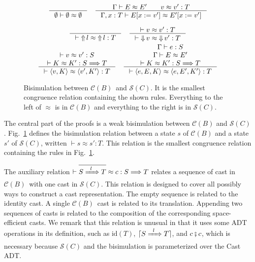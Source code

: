 \documentclass[runningheads]{llncs}
\newcommand{\infr}[2]{\inference{#1}{#2}}
\newcommand{\CMachine}[1]{\ensuremath{\mathcal{C}(#1)}}
\newcommand{\CBMachine}[0]{\CMachine{B}}
\newcommand{\SMachine}[1]{\ensuremath{\mathcal{S}(#1)}}
\newcommand{\error}[1]{\ensuremath{\mathop{\Uparrow}#1}}
\newcommand{\ccast}[3]{#1 \xRightarrow[]{\enskip #2 \enskip} #3}
\newcommand{\sexpr}[3]{\ensuremath{\langle#1,#2,#3\rangle}}
\newcommand{\scont}[2]{\ensuremath{\langle#1,#2\rangle}}
\newcommand{\shalt}[1]{\ensuremath{\mathop{\Downarrow} #1}}
\newcommand{\compose}[2]{\ensuremath{#1 \fatsemi #2}}
\newcommand{\translate}[1]{\ensuremath{\lceil#1\rceil}}
\newcommand{\id}[1]{\ensuremath{\mathrm{id}(#1)}}
\newcommand{\expressiontyping}[3]{\ensuremath{#1 \vdash #2 : #3}}
\newcommand{\valuetyping}[2]{\ensuremath{\vdash #1 : #2}}
\newcommand{\casttyping}[3]{\ensuremath{\vdash #1 : #2 \Longrightarrow #3}}
\newcommand{\bisimE}[3]{\ensuremath{#1 \vdash #2 \approx #3}}
\newcommand{\bisimv}[3]{\valuetyping{#1 \approx #2}{#3}}
\newcommand{\bisimc}[4]{\casttyping{#1 \approx #2}{#3}{#4}}
\newcommand{\bisimK}[4]{\casttyping{#1 \approx #2}{#3}{#4}}
\newcommand{\bisims}[3]{\valuetyping{\ensuremath{#1 \approx #2}}{#3}}
\begin{document}
\begin{figure}[tp]
\fbox{\bisimE{\Gamma}{E}{E}}
\begin{gather*}
\inference{
}{
	\bisimE{\emptyset}{\emptyset}{\emptyset}
}
\quad
\inference{
	\Gamma \vdash E \approx E' \qquad
	v \approx v' : T
}{
	\Gamma , x : T \vdash 
	E [ x := v' ] \approx E' [ x := v' ]
}
\end{gather*}

\fbox{\bisims{s}{s}{T}}
\begin{gather*}
\infr{}{\bisims{\error{l}}{\error{l}}{T}} \quad
\infr{
	\bisimv{v}{v'}{T}
}{
	\bisims{\shalt{v}}{\shalt{v'}}{T}
}
\\
\infr{
	\bisimv{v}{v'}{S} \\
	\bisimK{K}{K'}{S}{T}
}{
	\bisims{\scont{v}{K}}{\scont{v'}{K'}}{T}
} \quad
\infr{
	\expressiontyping{\Gamma}{e}{S} \\
	\bisimE{\Gamma}{E}{E'}          \\
	\bisimK{K}{K'}{S}{T}
}{
	\bisims{\sexpr{e}{E}{K}}{\sexpr{e}{E'}{K'}}{T}
}
\end{gather*}

\caption{Bisimulation between \CBMachine\ and \SMachine{C}. It is the
  smallest congruence relation containing the shown rules. Everything
  to the left of $\approx$ is in \CMachine{B} and everything to the
  right is in \SMachine{C}.}
\label{fig:bisim-SC-D}
\end{figure}

The central part of the proofs is a weak bisimulation between \CMachine{B} and \SMachine{C}.
Fig.~\ref{fig:bisim-SC-D} defines the bisimulation relation
between a state $s$ of \CMachine{B} and a state $s'$
of \SMachine{C}, written $\bisims{s}{s'}{T}$.
This relation is the smallest congruence relation containing the rules 
in Fig.~\ref{fig:bisim-SC-D}.

The auxiliary relation $\bisimc{\overline{\ccast{S}{l}{T}}}{c}{S}{T}$
relates a sequence of cast in \CBMachine\ with one cast in
\SMachine{C}. This relation is designed to cover all possibly ways to
construct a cast representation. The empty sequence is related to the
identity cast. A single \CBMachine\ cast is related to its
translation. Appending two sequences of casts is related to the
composition of the corresponding space-efficient casts.
%
We remark that this relation is unusual in that it uses some ADT
operations in its definition, such as $\id{T}$,
$\translate{\ccast{S}{l}{T}}$, and $\compose{c}{c}$, which is
necessary because \SMachine{C} and the bisimulation is parameterized
over the Cast ADT.
\end{document}
